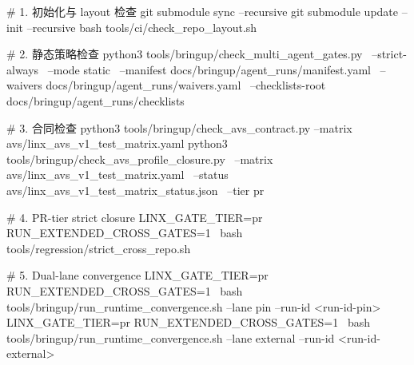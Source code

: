 \documentclass[UTF8,11pt,a4paper,oneside]{ctexbook}
\begin{document}
\begin{CodeBlock}
# 1. 初始化与 layout 检查
git submodule sync --recursive
git submodule update --init --recursive
bash tools/ci/check_repo_layout.sh

# 2. 静态策略检查
python3 tools/bringup/check_multi_agent_gates.py \
  --strict-always \
  --mode static \
  --manifest docs/bringup/agent_runs/manifest.yaml \
  --waivers docs/bringup/agent_runs/waivers.yaml \
  --checklists-root docs/bringup/agent_runs/checklists

# 3. 合同检查
python3 tools/bringup/check_avs_contract.py --matrix avs/linx_avs_v1_test_matrix.yaml
python3 tools/bringup/check_avs_profile_closure.py \
  --matrix avs/linx_avs_v1_test_matrix.yaml \
  --status avs/linx_avs_v1_test_matrix_status.json \
  --tier pr

# 4. PR-tier strict closure
LINX_GATE_TIER=pr RUN_EXTENDED_CROSS_GATES=1 \
bash tools/regression/strict_cross_repo.sh

# 5. Dual-lane convergence
LINX_GATE_TIER=pr RUN_EXTENDED_CROSS_GATES=1 \
bash tools/bringup/run_runtime_convergence.sh --lane pin --run-id <run-id-pin>
LINX_GATE_TIER=pr RUN_EXTENDED_CROSS_GATES=1 \
bash tools/bringup/run_runtime_convergence.sh --lane external --run-id <run-id-external>
\end{CodeBlock}
\end{document}
